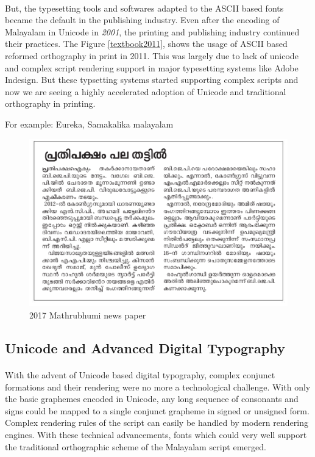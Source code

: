 \documentclass[10pt]{article}
\begin{document}
\paragraph{}
But, the typesetting tools and softwares adapted to the ASCII based fonts became the default in the publishing industry. Even after the encoding of Malayalam in Unicode in \textit{2001}, the printing and publishing industry continued their practices. The Figure \ref{textbook2011}, shows the usage of ASCII based reformed orthography in print in 2011. This was largely due to lack of unicode and complex script rendering support in major typesetting systems like Adobe Indesign. But these typsetting systems started supporting complex scripts and now we are seeing a highly accelerated adoption of Unicode and traditional orthography in printing.

For example: Eureka, Samakalika malayalam


\begin{figure}[h!]
 \centering
  \includegraphics[width=1.0\textwidth]{images/2017-Mathrubhumi-newspaper.png}
   \caption{2017 Mathrubhumi news paper}
\end{figure}

\subsection{Unicode and Advanced Digital Typography}

\paragraph{}
With the advent of Unicode based digital typography, complex conjunct formations and their rendering were no more a technological challenge. With only the basic graphemes encoded in Unicode, any long sequence of consonants and signs could be mapped to a single conjunct grapheme in signed or unsigned form. Complex rendering rules of the script can easily be handled by modern rendering engines. With these technical advancements, fonts which could very well support the traditional orthographic scheme of the Malayalam script emerged. 
\end{document}
